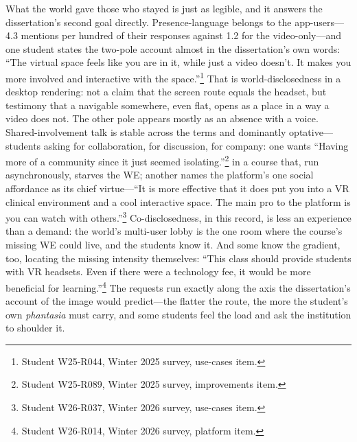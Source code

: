 \documentclass{article}
\begin{document}
What the world gave those who stayed is just as legible, and it answers the dissertation's second goal directly. Presence-language belongs to the app-users---4.3 mentions per hundred of their responses against 1.2 for the video-only---and one student states the two-pole account almost in the dissertation's own words: ``The virtual space feels like you are in it, while just a video doesn't. It makes you more involved and interactive with the space.''\footnote{Student W25-R044, Winter 2025 survey, use-cases item.} That is world-disclosedness in a desktop rendering: not a claim that the screen route equals the headset, but testimony that a navigable somewhere, even flat, opens as a place in a way a video does not. The other pole appears mostly as an absence with a voice. Shared-involvement talk is stable across the terms and dominantly optative---students asking for collaboration, for discussion, for company: one wants ``Having more of a community since it just seemed isolating.''\footnote{Student W25-R089, Winter 2025 survey, improvements item.} in a course that, run asynchronously, starves the WE; another names the platform's one social affordance as its chief virtue---``It is more effective that it does put you into a VR clinical environment and a cool interactive space. The main pro to the platform is you can watch with others.''\footnote{Student W26-R037, Winter 2026 survey, use-cases item.} Co-disclosedness, in this record, is less an experience than a demand: the world's multi-user lobby is the one room where the course's missing WE could live, and the students know it. And some know the gradient, too, locating the missing intensity themselves: ``This class should provide students with VR headsets. Even if there were a technology fee, it would be more beneficial for learning.''\footnote{Student W26-R014, Winter 2026 survey, platform item.} The requests run exactly along the axis the dissertation's account of the image would predict---the flatter the route, the more the student's own \textit{phantasia} must carry, and some students feel the load and ask the institution to shoulder it.
\end{document}
